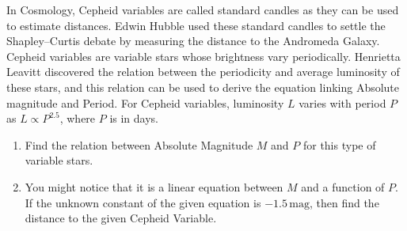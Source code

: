 In Cosmology, Cepheid variables are called standard candles as they can be used to estimate distances. Edwin Hubble used these standard candles to settle the Shapley--Curtis debate by measuring the distance to the Andromeda Galaxy. Cepheid variables are variable stars whose brightness vary periodically. Henrietta Leavitt discovered the relation between the periodicity and average luminosity of these stars, and this relation can be used to derive the equation linking Absolute magnitude and Period. For Cepheid variables, luminosity $L$ varies with period $P$ as $L\propto P^{2.5}$, where $P$ is in days.
\begin{enumerate}
\item Find the relation between Absolute Magnitude $M$ and $P$ for this type of variable stars.
\item You might notice that it is a linear equation between $M$ and a function of $P$. If the unknown constant of the given equation is $-1.5\,\mathrm{mag}$, then find the distance to the given Cepheid Variable.
\end{enumerate}
